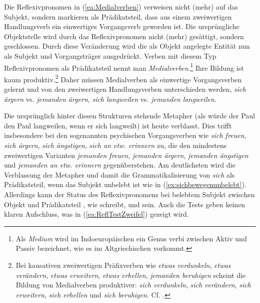Die Reflexivpronomen in (\ref{ea:Medialverben}) verweisen nicht (mehr) auf das Subjekt, sondern markieren als Prädikatsteil, dass aus einem zweiwertigen Handlungsverb ein einwertiges Vorgangsverb geworden ist. Die ursprüngliche Objektstelle wird durch das Reflexivpronomen nicht (mehr) gesättigt, sondern geschlossen. Durch diese Veränderung wird die als Objekt angelegte Entität nun als Subjekt und Vorgangsträger ausgedrückt. Verben mit diesem Typ Reflexivpronomen als Prädikatsteil nennt man \textit{Medialverben}.\footnote{Als \textit{Medium} wird im Indoeuropäischen ein Genus verbi zwischen Aktiv und Passiv bezeichnet, wie es im Altgriechischen vorkommt.} Ihre Bildung ist kaum produktiv.\footnote{Bei kausativen zweiwertigen Präfixverben wie \textit{etwas verdunkeln}, \textit{etwas verändern}, \textit{etwas erweitern}, \textit{etwas erhellen}, \textit{jemanden beruhigen} scheint die Bildung von Medialverben produktiver: \textit{sich verdunkeln}, \textit{sich verändern}, \textit{sich erweitern}, \textit{sich erhellen} und \textit{sich beruhigen}. Cf. \citet[18]{Haspelmath1987}.} Daher müssen Medialverben als einwertige Vorgangsverben gelernt und von den zweiwertigen Handlungsverben unterschieden werden, \zB \textit{sich ärgern} vs. \textit{jemanden ärgern}, \textit{sich langweilen} vs. \textit{jemanden langweilen}. 

Die ursprünglich hinter diesen Strukturen stehende Metapher (als würde der Paul den Paul langweilen, wenn er sich langweilt) ist heute verblasst. Dies trifft insbesondere bei den sogenannten psychischen Vorgangsverben wie \textit{sich freuen}, \textit{sich ärgern}, \textit{sich ängstigen}, \textit{sich an etw. erinnern} zu, die den mindestens zweiwertigen Varianten \textit{jemanden freuen}, \textit{jemanden ärgern}, \textit{jemanden ängstigen} und \textit{jemanden an etw. erinnern} gegenüberstehen. Am deutlichsten wird die Verblassung der Metapher und damit die Grammatikalisierung von \textit{sich} als Prädikatsteil, wenn das Subjekt unbelebt ist wie in (\ref{ex:sichbewegenunbelebt}). Allerdings kann der Status des Reflexivpronomens bei belebtem Subjekt zwischen Objekt und Prädikatsteil , wie \citet[148]{Kunze1997} schreibt, und  sein. Auch die Tests geben keinen klaren Aufschluss, was in (\ref{ea:ReflTestZweifel}) gezeigt wird.

\largerpage
\ea \label{ea:ReflTestZweifel}
\label{ea:sichdrehenbelebt}
\label{ex:wendrehtPaul}
\label{ex:sichunddrehen}
\label{ex:NPdrehen}
\z 
\z 

